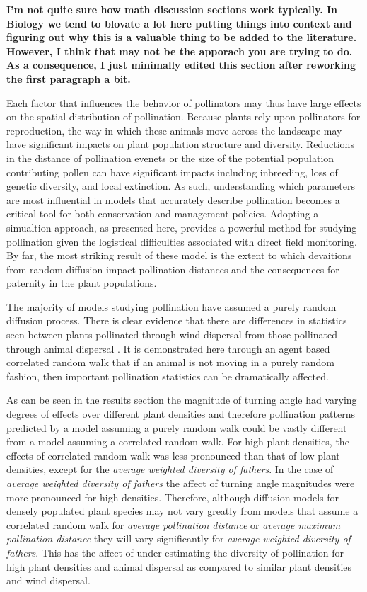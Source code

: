 \textbf{I'm not quite sure how math discussion sections work typically. In Biology we tend to blovate a lot here 
putting things into context and figuring out why this is a valuable thing to be added to the literature.  However,
I think that may not be the apporach you are trying to do.  As a consequence, I just minimally edited this section 
after reworking the first paragraph a bit. }

Each factor that influences the behavior of pollinators may thus have large effects on the spatial distribution of pollination. Because plants rely upon pollinators for reproduction, the way in which these animals move across the landscape may have significant impacts on plant population structure and diversity. Reductions in the distance of pollination evenets or the size of the potential population contributing pollen can have significant impacts including inbreeding, loss of genetic diversity, and local extinction.  As such, understanding which parameters are most influential in models that accurately describe pollination becomes a critical tool for both conservation and management policies.  Adopting a simualtion approach, as presented here, provides a powerful method for studying pollination given the logistical difficulties associated with direct field monitoring.  By far, the most striking result of these model is the extent to which devaitions from random diffusion impact pollination distances and the consequences for paternity in the plant populations. 

The majority of models studying pollination have assumed a purely random diffusion process. There is
clear evidence that there are differences in statistics seen between plants pollinated through wind
dispersal from those pollinated through animal dispersal \cite{LevinKerster}.  It is demonstrated here through
an agent based correlated random walk that if an animal is not moving in a purely random fashion,
then important pollination statistics can be dramatically affected. 

As can be seen in the results section the magnitude of turning angle had varying degrees of effects
over different plant densities and therefore pollination patterns predicted by a model assuming a
purely random walk could be vastly different from a model assuming a correlated random walk. For
high plant densities, the effects of correlated random walk was less pronounced than that of low
plant densities, except for the \emph{average weighted diversity of fathers}. In the case of
\emph{average weighted diversity of fathers} the affect of turning angle magnitudes were more
pronounced for high densities. Therefore, although diffusion models for densely populated plant
species may not vary greatly from models that assume a correlated random walk for \emph{average
pollination distance} or \emph{average maximum pollination distance} they will vary significantly
for \emph{average weighted diversity of fathers}. This has the affect of under estimating the
diversity of pollination for high plant densities and animal dispersal as compared to similar plant
densities and wind dispersal.

